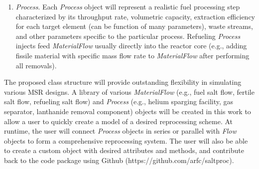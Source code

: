 \begin{enumerate}
	\item \textit{Process}. Each \textit{Process} object will represent a 
	realistic fuel processing step characterized by its throughput rate, 
	volumetric capacity, extraction efficiency for each target element (can be 
	function of many parameters), waste streams, and other parameters specific to 		the particular process. Refueling 
	\textit{Process} injects feed \textit{MaterialFlow} usually directly 
	into the reactor core (e.g., adding fissile material with specific mass flow 		rate to \textit{MaterialFlow} after performing all removals).
\end{enumerate}

The proposed class structure will provide outstanding flexibility in simulating 
various \gls{MSR} designs. A library of various \textit{MaterialFlow} (e.g., 
fuel salt flow, fertile salt flow, refueling salt flow) and \textit{Process} 
(e.g., helium sparging facility, gas separator, lanthanide removal component) 
objects will be created in this work to allow a user to quickly create a model 
of a desired reprocessing scheme. At runtime, the user will connect 
\textit{Process} objects in series or parallel with \textit{Flow} objects to 
form a comprehensive reprocessing system. The user will also be able to create 
a custom object with desired attributes and methods, and contribute back 
to the code package using Github (https://github.com/arfc/saltproc).	

